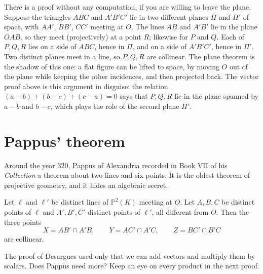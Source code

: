 \begin{beauty}
There is a proof without any computation, if you are willing to leave the plane. Suppose the triangles $ABC$ and $A'B'C'$ lie in two different
planes $\Pi$ and $\Pi'$ of space, with $AA'$, $BB'$, $CC'$ meeting at $O$. The lines $AB$ and $A'B'$ lie in the plane $OAB$, so they meet (projectively)
at a point $R$; likewise for $P$ and $Q$. Each of $P,Q,R$ lies on a side of $ABC$, hence in $\Pi$, and on a side of $A'B'C'$, hence in $\Pi'$. Two
distinct planes meet in a line, so $P,Q,R$ are collinear. The plane theorem is the shadow of this one: a flat figure can be lifted to space,
by moving $O$ out of the plane while keeping the other incidences, and then projected back. The vector proof above is this argument in
disguise: the relation $(a-b)+(b-c)+(c-a)=0$ says that $P,Q,R$ lie in the plane spanned by $a-b$ and $b-c$, which plays the role of the second
plane $\Pi'$.
\end{beauty}

\section{Pappus' theorem}

Around the year 320, Pappus of Alexandria recorded in Book VII of his \emph{Collection} a theorem about two lines and six points. It is the
oldest theorem of projective geometry, and it hides an algebraic secret.

\begin{theorem}[Pappus]\label{thm:pappusline}
Let $\ell$ and $\ell'$ be distinct lines of $\mathbb P^2(K)$ meeting at $O$. Let $A,B,C$ be distinct points of $\ell$ and $A',B',C'$ distinct
points of $\ell'$, all different from $O$. Then the three points
\[
X=AB'\cap A'B,\qquad Y=AC'\cap A'C,\qquad Z=BC'\cap B'C
\]
are collinear.
\end{theorem}

\begin{think}
The proof of Desargues used only that we can add vectors and multiply them by scalars. Does Pappus need more? Keep an eye on every product in
the next proof.
\end{think}

